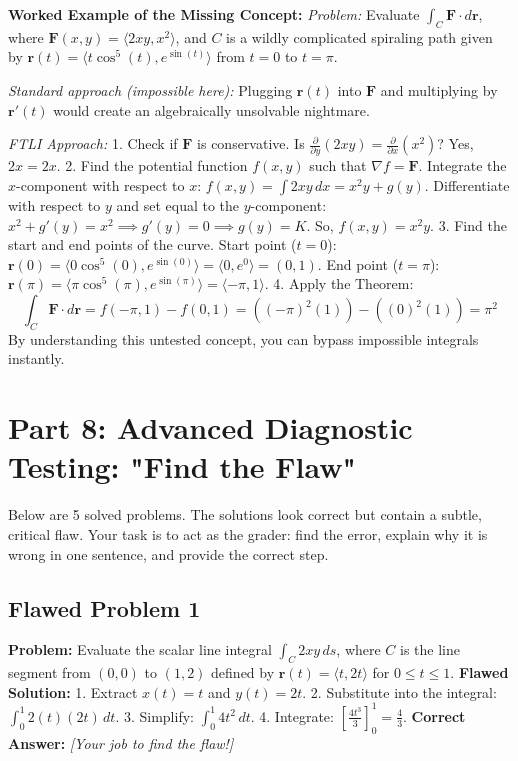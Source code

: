 \documentclass{article}
\begin{document}
\textbf{Worked Example of the Missing Concept:}
\textit{Problem:} Evaluate $\int_C \mathbf{F} \cdot d\mathbf{r}$, where $\mathbf{F}(x,y) = \langle 2xy, x^2 \rangle$, and $C$ is a wildly complicated spiraling path given by $\mathbf{r}(t) = \langle t\cos^5(t), e^{\sin(t)} \rangle$ from $t = 0$ to $t = \pi$.

\textit{Standard approach (impossible here):} Plugging $\mathbf{r}(t)$ into $\mathbf{F}$ and multiplying by $\mathbf{r}'(t)$ would create an algebraically unsolvable nightmare.

\textit{FTLI Approach:} 
1. Check if $\mathbf{F}$ is conservative. Is $\frac{\partial}{\partial y}(2xy) = \frac{\partial}{\partial x}(x^2)$? Yes, $2x = 2x$. 
2. Find the potential function $f(x,y)$ such that $\nabla f = \mathbf{F}$. 
   Integrate the $x$-component with respect to $x$: $f(x,y) = \int 2xy \, dx = x^2y + g(y)$.
   Differentiate with respect to $y$ and set equal to the $y$-component: $x^2 + g'(y) = x^2 \implies g'(y) = 0 \implies g(y) = K$.
   So, $f(x,y) = x^2y$.
3. Find the start and end points of the curve.
   Start point ($t=0$): $\mathbf{r}(0) = \langle 0\cos^5(0), e^{\sin(0)} \rangle = \langle 0, e^0 \rangle = (0, 1)$.
   End point ($t=\pi$): $\mathbf{r}(\pi) = \langle \pi\cos^5(\pi), e^{\sin(\pi)} \rangle = \langle -\pi, 1 \rangle$.
4. Apply the Theorem:
   \[ \int_C \mathbf{F} \cdot d\mathbf{r} = f(-\pi, 1) - f(0, 1) = ((-\pi)^2(1)) - ((0)^2(1)) = \pi^2 \]
By understanding this untested concept, you can bypass impossible integrals instantly.

\newpage

\section{Part 8: Advanced Diagnostic Testing: "Find the Flaw"}

Below are 5 solved problems. The solutions look correct but contain a subtle, critical flaw. Your task is to act as the grader: find the error, explain why it is wrong in one sentence, and provide the correct step.

\subsection{Flawed Problem 1}
\textbf{Problem:} Evaluate the scalar line integral $\int_C 2xy \, ds$, where $C$ is the line segment from $(0,0)$ to $(1,2)$ defined by $\mathbf{r}(t) = \langle t, 2t \rangle$ for $0 \leq t \leq 1$.
\textbf{Flawed Solution:}
1. Extract $x(t) = t$ and $y(t) = 2t$.
2. Substitute into the integral: $\int_0^1 2(t)(2t) \, dt$.
3. Simplify: $\int_0^1 4t^2 \, dt$.
4. Integrate: $\left[ \frac{4t^3}{3} \right]_0^1 = \frac{4}{3}$.
\textbf{Correct Answer:} \textit{[Your job to find the flaw!]}
\end{document}

